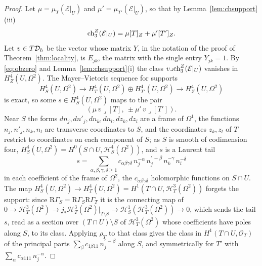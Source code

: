 \begin{proof}
Let $\mu=\mu_{T}(\mathcal{E}|_{U})$ and $\mu'=\mu_{T'}(\mathcal{E}|_{U})$, so that by Lemma~\ref{lem:chsupport}(iii)
\[
\mathrm{ch}^{Z}_{3}(\mathcal{E}|_{U})=\mu[T]_{Z}+\mu'[T']_{Z}.
\]
Let $v\in T\mathcal{D}_{h}$ be the vector whose matrix $Y$, in the notation of the proof of Theorem~\ref{thm:locality}, is $E_{jk}$, the matrix with the single entry $Y_{jk}=1$. By \eqref{eq:obzero} and Lemma~\ref{lem:chsupport}(i) the class $v\lrcorner\mathrm{ch}^{Z}_{3}(\mathcal{E}|_{U})$ vanishes in $H^{4}_{Z}(U,\Omega^{2})$. The Mayer--Vietoris sequence for supports
\[
H^{4}_{S}(U,\Omega^{2})\to H^{4}_{T}(U,\Omega^{2})\oplus H^{4}_{T'}(U,\Omega^{2})\to H^{4}_{Z}(U,\Omega^{2})
\]
is exact, so some $s\in H^{4}_{S}(U,\Omega^{2})$ maps to the pair
\[
(\mu\,v\lrcorner[T],\ \pm\mu'\,v\lrcorner[T']).
\]
Near $S$ the forms $dn_{j},dn'_{j},dn_{k},dn_{l},dz_{k},dz_{l}$ are a frame of $\Omega^{1}$, the functions $n_{j},n'_{j},n_{k},n_{l}$ are transverse coordinates to $S$, and the coordinates $z_{k},z_{l}$ of $T$ restrict to coordinates on each component of $S$; as $S$ is smooth of codimension four, $H^{4}_{S}(U,\Omega^{2})=H^{0}(S\cap U,\mathcal{H}^{4}_{S}(\Omega^{2}))$, and $s$ is a Laurent tail
\[
s=\sum_{\alpha,\beta,\gamma,\delta\ge1}c_{\alpha\beta\gamma\delta}\,n_{j}^{-\alpha}\,n_{j}^{\prime\,-\beta}\,n_{k}^{-\gamma}\,n_{l}^{-\delta}
\]
in each coefficient of the frame of $\Omega^{2}$, the $c_{\alpha\beta\gamma\delta}$ holomorphic functions on $S\cap U$. The map $H^{4}_{S}(U,\Omega^{2})\to H^{4}_{T}(U,\Omega^{2})=H^{1}(T\cap U,\mathcal{H}^{3}_{T}(\Omega^{2}))$ forgets the support: since $\mathrm{R}\Gamma_{S}=\mathrm{R}\Gamma_{S}\mathrm{R}\Gamma_{T}$ it is the connecting map of $0\to\mathcal{H}^{3}_{T}(\Omega^{2})\to j_{*}\mathcal{H}^{3}_{T}(\Omega^{2})|_{T\setminus S}\to\mathcal{H}^{1}_{S}(\mathcal{H}^{3}_{T}(\Omega^{2}))\to0$, which sends the tail $s$, read as a section over $(T\cap U)\setminus S$ of $\mathcal{H}^{3}_{T}(\Omega^{2})$ whose coefficients have poles along $S$, to its class. Applying $\rho_{T}$ to that class gives the class in $H^{1}(T\cap U,\mathcal{O}_{T})$ of the principal parts $\sum_{\beta}c_{1\beta11}\,n_{j}^{\prime\,-\beta}$ along $S$, and symmetrically for $T'$ with $\sum_{\alpha}c_{\alpha111}\,n_{j}^{-\alpha}$.


\end{proof}
